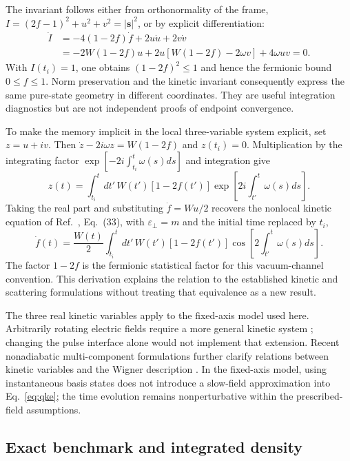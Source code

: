 \documentclass[11pt,a4paper]{article}
\begin{document}
The invariant follows either from orthonormality of the frame, $I=(2f-1)^2+u^2+v^2=|\bm{s}|^2$, or by explicit differentiation:
\begin{align}
 \dot I&=-4(1-2f)\dot f+2u\dot u+2v\dot v\nonumber\\
 &=-2W(1-2f)u+2u[W(1-2f)-2\omega v]+4\omega uv=0.
 \label{eq:invariantproof}
\end{align}
With $I(t_i)=1$, one obtains $(1-2f)^2\leq1$ and hence the fermionic bound $0\leq f\leq1$. Norm preservation and the kinetic invariant consequently express the same pure-state geometry in different coordinates. They are useful integration diagnostics but are not independent proofs of endpoint convergence.

To make the memory implicit in the local three-variable system explicit, set $z=u+iv$. Then $\dot z-2i\omega z=W(1-2f)$ and $z(t_i)=0$. Multiplication by the integrating factor $\exp[-2i\int_{t_i}^{t}\omega(s)ds]$ and integration give
\begin{equation}
 z(t)=\int_{t_i}^{t}dt'\,W(t')[1-2f(t')]
       \exp\!\left[2i\int_{t'}^t\omega(s)ds\right].
\end{equation}
Taking the real part and substituting $\dot f=Wu/2$ recovers the nonlocal kinetic equation of Ref.~\cite{Schmidt1998}, Eq.~(33), with $\varepsilon_\perp=m$ and the initial time replaced by $t_i$,
\begin{equation}
 \dot f(t)=\frac{W(t)}2\int_{t_i}^{t}dt'\,W(t')[1-2f(t')]
 \cos\!\left[2\int_{t'}^t\omega(s)ds\right].
 \label{eq:memory}
\end{equation}
The factor $1-2f$ is the fermionic statistical factor for this vacuum-channel convention. This derivation explains the relation to the established kinetic and scattering formulations \cite{Schmidt1998,Dumlu2009,Hebenstreit2010,LiGong2021} without treating that equivalence as a new result.

The three real kinetic variables apply to the fixed-axis model used here. Arbitrarily rotating electric fields require a more general kinetic system \cite{Aleksandrov2024}; changing the pulse interface alone would not implement that extension. Recent nonadiabatic multi-component formulations further clarify relations between kinetic variables and the Wigner description \cite{LiJiang2026}. In the fixed-axis model, using instantaneous basis states does not introduce a slow-field approximation into Eq.~\eqref{eq:qke}; the time evolution remains nonperturbative within the prescribed-field assumptions.

\subsection{Exact benchmark and integrated density}
\end{document}
